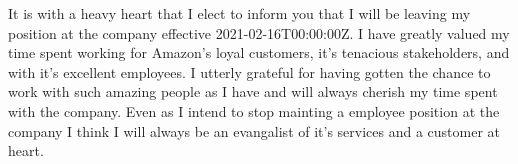\documentclass[12pt,stdletter,orderfromtodate,sigleft]{newlfm}
\begin{document}
\begin{newlfm}
It is with a heavy heart that I elect to inform you that I will be leaving my position at the company effective 2021-02-16T00:00:00Z. I have greatly valued my time spent working for Amazon's loyal customers, it's tenacious stakeholders, and with it's excellent employees. I utterly grateful for having gotten the chance to work with such amazing people as I have and will always cherish my time spent with the company. Even as I intend to stop mainting a employee position at the company I think I will always be an evangalist of it's services and a customer at heart.
\end{newlfm}
\end{document}
